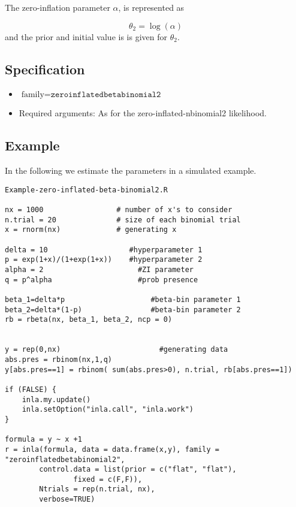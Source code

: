 \documentclass[a4paper,11pt]{article}
\begin{document}
\vspace{5mm}

\noindent
The zero-inflation parameter $\alpha$, is represented as

\begin{displaymath}
    \theta_2 = \log(\alpha)
\end{displaymath}
and the prior and initial value is is given for  $\theta_{2}$.

\subsection*{Specification}

\begin{itemize}
\item $\text{family}=\texttt{zeroinflatedbetabinomial2}$
\item Required arguments: As for the zero-inflated-nbinomial2 likelihood.
\end{itemize}

\subsection*{Example}

In the following we estimate the parameters in a simulated
example.

\begin{verbatim}
Example-zero-inflated-beta-binomial2.R

nx = 1000                 # number of x's to consider
n.trial = 20              # size of each binomial trial
x = rnorm(nx)             # generating x

delta = 10                   #hyperparameter 1
p = exp(1+x)/(1+exp(1+x))    #hyperparameter 2
alpha = 2                      #ZI parameter
q = p^alpha                    #prob presence

beta_1=delta*p                    #beta-bin parameter 1
beta_2=delta*(1-p)                #beta-bin parameter 2					
rb = rbeta(nx, beta_1, beta_2, ncp = 0)

	
y = rep(0,nx)                       #generating data			
abs.pres = rbinom(nx,1,q)
y[abs.pres==1] = rbinom( sum(abs.pres>0), n.trial, rb[abs.pres==1])

if (FALSE) {
    inla.my.update()
    inla.setOption("inla.call", "inla.work")
}

formula = y ~ x +1
r = inla(formula, data = data.frame(x,y), family = "zeroinflatedbetabinomial2",
        control.data = list(prior = c("flat", "flat"),
                fixed = c(F,F)),
        Ntrials = rep(n.trial, nx),
        verbose=TRUE)
\end{verbatim}
\end{document}
